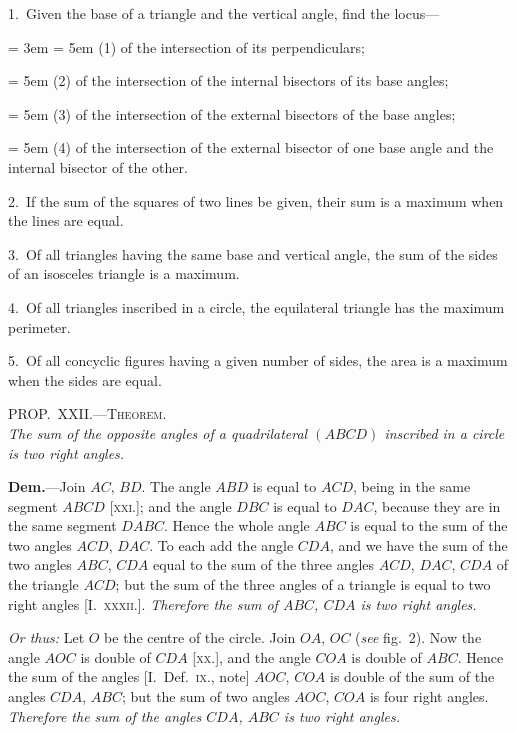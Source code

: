 \documentclass[oneside]{book}
\newcommand\myprop[2]{
\bigskip\Needspace*{4\baselineskip}\begin{center}\textsc{#1}\\\medskip\emph{#2}\par\end{center}
}
\newcommand\imgcent[2]{
\begin{center}
\end{center}
}
\begin{document}
\begin{footnotesize}
1.~Given the base of a triangle and the vertical angle, find the
locus---

{\parindent= 3em
\hangindent= 5em
(1) of the intersection of its perpendiculars;

\hangindent= 5em
(2) of the intersection of the internal bisectors of its base
angles;

\hangindent= 5em
(3) of the intersection of the external bisectors of the base
angles;

\hangindent= 5em
(4) of the intersection of the external bisector of one base
angle and the internal bisector of the other.
}

2.~If the sum of the squares of two lines be given, their sum
is a maximum when the lines are equal.

3.~Of all triangles having the same base and vertical angle, the
sum of the sides of an isosceles triangle is a maximum.

4.~Of all triangles inscribed in a circle, the equilateral triangle
has the maximum perimeter.

5.~Of all concyclic figures having a given number of sides, the
area is a maximum when the sides are equal.
\par\end{footnotesize}

\myprop{PROP\@.~XXII\@.---Theorem.}{The sum of the opposite angles of a quadrilateral $(ABCD)$
inscribed in a circle is two right angles.}

\imgcent{225}{f129}

\textbf{Dem.}---Join $AC$, $BD$. The angle $ABD$ is equal to
$ACD$, being in the same segment $ABCD$ [\textsc{xxi.}]; and
the angle $DBC$ is equal to $DAC$, because they are in
the same segment $DABC$. Hence the whole angle $ABC$
is equal to the sum of the two angles $ACD$, $DAC$. To
each add the angle $CDA$, and we have the sum of the
two angles $ABC$, $CDA$ equal to the sum of the three
angles $ACD$, $DAC$, $CDA$ of the triangle $ACD$; but the
sum of the three angles of a triangle is equal to two
right angles [I.~\textsc{xxxii.}]. \emph{Therefore the sum of $ABC$,
$CDA$ is two right angles.}

\emph{Or thus:} Let $O$ be the centre of the circle. Join
$OA$, $OC$ (\emph{see} fig.~2). Now the angle $AOC$ is double of
$CDA$ [\textsc{xx.}], and the angle $COA$ is double of $ABC$.
Hence the sum of the angles [I.~Def.~\textsc{ix.}, note]
$AOC$, $COA$ is double of the sum of the angles $CDA$,
$ABC$; but the sum of two angles $AOC$, $COA$ is four
right angles. \emph{Therefore the sum of the angles $CDA$,
$ABC$ is two right angles.}
\end{document}
